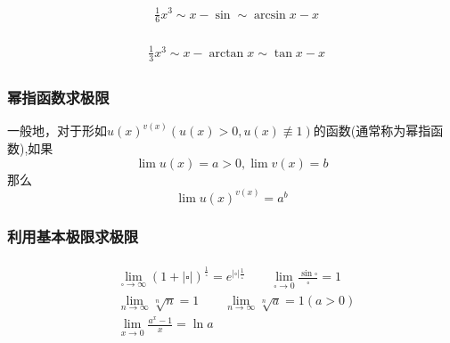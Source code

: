 \documentclass[12pt, a4paper, oneside, UTF8]{ctexbook}  %
\begin{document}
\begin{sloppypar}
    \begin{align*} \boxed
        {
            \begin{aligned}
                 & \frac{1}{6} x^3 \sim x-\sin \sim \arcsin x -x
            \end{aligned}
        }
    \end{align*}

    \begin{align*} \boxed
        {
            \begin{aligned}
                 & \frac{1}{3} x^3 \sim x-\arctan x \sim \tan x-x
            \end{aligned}
        }
    \end{align*}
    \subsubsection{幂指函数求极限}
    \begin{defn}{}{}
        一般地，对于形如$u\left(x\right)^{v\left(x\right)}\left(u\left(x\right)>0,u\left(x\right)\not\equiv1\right)$的函数(通常称为幂指函数),如果
        $$
            \lim u\left(x\right)=a{>}0,\lim v\left(x\right)=b
        $$
        那么
        $$
            \lim u(x)^{v(x)}=a^{b}
        $$
    \end{defn}
    \subsubsection{利用基本极限求极限}

    \begin{align*} \boxed
        {
            \begin{aligned}
                 & \lim_{\square \to \infty }(1+|\square|)^{\frac{1}{\square}}=e^{|\square| \frac{1}{\square}} \qquad     \lim _ { \square \rightarrow 0 } \frac { \sin \square } { \square } = 1 \\
                 & \lim_{n \to \infty }\sqrt[n]{n}=1 \qquad \lim_{n \to \infty} \sqrt[n]{a}=1(a>0)                                                                                                \\
                 & \lim_{x \to 0} \frac{a^x-1}{x}=\ln a
            \end{aligned}
        }
    \end{align*}



\end{sloppypar}
\end{document}
